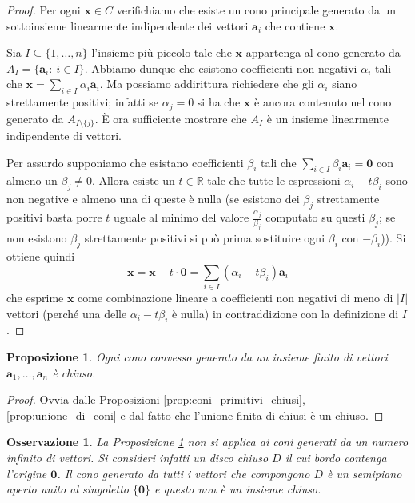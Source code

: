 \documentclass[italian, letter paper, 12pt, reqno]{article}
\theoremstyle{myteo}
\newtheorem{proposition}[theorem]{Proposizione}
\newtheorem{remark}[theorem]{Osservazione}
\numberwithin{equation}{section}
\begin{document}
\begin{proof}
  Per ogni \(\mathbf{x}\in C\) verifichiamo che esiste un cono principale generato da un sottoinsieme linearmente indipendente dei vettori \(\mathbf{a}_i\) che contiene \(\mathbf{x}\).

  Sia \(I\subseteq\{1,\ldots, n\}\) l'insieme più piccolo tale che \(\mathbf{x}\) appartenga al cono generato da \(A_I=\{\mathbf{a}_i\colon\ i\in I\}\).
  Abbiamo dunque che esistono coefficienti non negativi \(\alpha_i\) tali che \(\mathbf{x} = \sum_{i\in I}\alpha_i \mathbf{a}_i\).
  Ma possiamo addirittura richiedere che gli \(\alpha_i\) siano strettamente positivi; infatti se \(\alpha_j = 0\) si ha che \(\mathbf{x}\) è ancora contenuto nel cono generato da \(A_{I\setminus\{j\}}\).
  È ora sufficiente mostrare che \(A_I\) è un insieme linearmente indipendente di vettori.

  Per assurdo supponiamo che esistano coefficienti \(\beta_i\) tali che \(\sum_{i\in I}\beta_i \mathbf{a}_i=\mathbf{0}\) con almeno un \(\beta_j\neq0\).
  Allora esiste un \(t\in \mathbb{R}\) tale che tutte le espressioni \(\alpha_i - t\beta_i\) sono non negative e almeno una di queste è nulla (se esistono dei \(\beta_j\) strettamente positivi basta porre \(t\) uguale al minimo del valore \(\frac{\alpha_j}{\beta_j}\) computato su questi \(\beta_j\); se non esistono \(\beta_j\) strettamente positivi si può prima sostituire ogni \(\beta_i\) con \(-\beta_i\))).
  Si ottiene quindi  
  \begin{equation*}
    \mathbf{x} = \mathbf{x} - t\cdot\mathbf{0} = \sum_{i\in I}(\alpha_i - t\beta_i)\mathbf{a}_i
  \end{equation*}
  che esprime \(\mathbf{x}\) come combinazione lineare a coefficienti non negativi di meno di \(|I|\) vettori (perché una delle \(\alpha_i - t\beta_i\) è nulla) in contraddizione con la definizione di \(I\).
\end{proof}

\begin{proposition}
  \label{prop:coni_chiusi}
  Ogni cono convesso generato da un insieme finito di vettori \(\mathbf{a}_1,\ldots,\mathbf{a}_n\) è chiuso.
\end{proposition}

\begin{proof}
  Ovvia dalle Proposizioni \ref{prop:coni_primitivi_chiusi}, \ref{prop:unione_di_coni} e dal fatto che l'unione finita di chiusi è un chiuso.
\end{proof}

\begin{remark}
  \label{oss:numero_finito}
  La Proposizione \ref{prop:coni_chiusi} non si applica ai coni generati da un numero infinito di vettori.
  Si consideri infatti un disco chiuso \(D\) il cui bordo contenga l'origine \(\mathbf{0}\).
  Il cono generato da tutti i vettori che compongono \(D\) è un semipiano aperto unito al singoletto \(\{\mathbf{0}\}\) e questo non è un insieme chiuso.
\end{remark}
\end{document}
